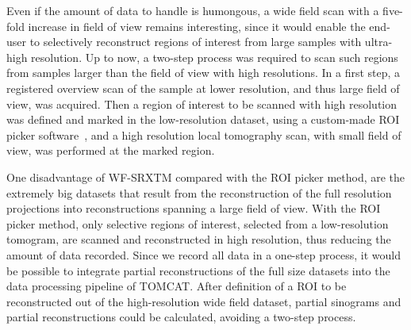 Even if the amount of data to handle is humongous, a wide field scan with a five-fold increase in field of view remains interesting, since it would enable the end-user to selectively reconstruct regions of interest from large samples with ultra-high resolution. Up to now, a two-step process was required to scan such regions from samples larger than the field of view with high resolutions. In a first step, a registered overview scan of the sample at lower resolution, and thus large field of view, was acquired. Then a region of interest to be scanned with high resolution was defined and marked in the low-resolution dataset, using a custom-made ROI picker software~\cite{Heinzer2008}, and a high resolution local tomography scan, with small field of view, was performed at the marked region.

One disadvantage of WF-SRXTM compared with the ROI picker method, are the extremely big datasets that result from the reconstruction of the full resolution projections into reconstructions spanning a large field of view. With the ROI picker method, only selective regions of interest, selected from a low-resolution tomogram, are scanned and reconstructed in high resolution, thus reducing the amount of data recorded. Since we record all data in a one-step process, it would be possible to integrate partial reconstructions of the full size datasets into the data processing pipeline of TOMCAT. After definition of a ROI to be reconstructed out of the high-resolution wide field dataset, partial sinograms and partial reconstructions could be calculated, avoiding a two-step process. 